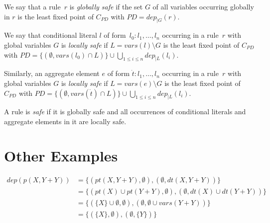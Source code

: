 \documentclass{article}
\newcommand{\tuple}[1]{\dot{#1}}
\newcommand{\set}[1]{\{#1\}}
\newcommand{\dep}[2]{\{(#1), (#2)\}}
\newcommand\Vars{\mathit{vars}}
\newcommand\Provide{\mathit{pt}}
\newcommand\Depend{\mathit{dt}}
\newcommand\ProDep{\mathit{dep}}
\newcommand\PD{\mathit{P\!D}}
\newcommand\CheckOp[1]{C_{#1}}
\begin{document}
	We say that a rule~$r$ is \emph{globally safe} if the set $G$ of all variables occurring globally in $r$ is the least fixed point of $\CheckOp{\PD}$ with $\PD=\ProDep_{|G}(r)$.

	We say that conditional literal $l$ of form~$l_0 : l_1, \dots, l_n$ occurring in a rule~$r$ with global variables $G$ is \emph{locally safe} if
$L = \Vars(l) \setminus G$ is the least fixed point of $\CheckOp{\PD}$ with $\PD=\set{(\emptyset, \Vars(l_0) \cap L)} \cup \bigcup_{1 \leq i \leq n} \ProDep_{|L}(l_i)$.

	Similarly, an aggregate element $e$ of form $\tuple{t}: l_1, \dots, l_n$ occurring in a rule~$r$ with global variables $G$ is \emph{locally safe} if
$L = \Vars(e) \setminus G$ is the least fixed point of $\CheckOp{\PD}$ with $\PD=\set{(\emptyset, \Vars(\tuple{t}) \cap L)} \cup \bigcup_{1 \leq i \leq n} \ProDep_{|L}(l_i)$.

A rule is \emph{safe} if it is globally safe and all occurrences of conditional literals and aggregate elements in it are locally safe.

	\section{Other Examples}
	\begin{align*}
		dep(p(X,Y+Y)) &= \dep{\Provide(X,Y+Y), \emptyset}{\emptyset, \Depend(X,Y+Y)}
		\\ &= \dep{\Provide(X) \cup \Provide(Y+Y), \emptyset}{\emptyset, \Depend(X) \cup \Depend(Y+Y)}
		\\ &= \dep{\set{X} \cup \emptyset, \emptyset}{\emptyset, \emptyset \cup vars(Y+Y)}
		\\ &= \dep{\set{X}, \emptyset}{\emptyset, \set{Y}}
	\end{align*}
\end{document}
